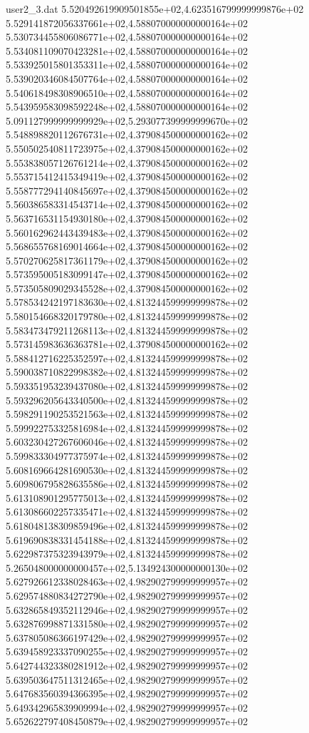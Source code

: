 \begin{filecontents}{user2_3.dat}
5.520492619909501855e+02,4.623516799999999876e+02
5.529141872056337661e+02,4.588070000000000164e+02
5.530734455806086771e+02,4.588070000000000164e+02
5.534081109070423281e+02,4.588070000000000164e+02
5.533925015801353311e+02,4.588070000000000164e+02
5.539020346084507764e+02,4.588070000000000164e+02
5.540618498308906510e+02,4.588070000000000164e+02
5.543959583098592248e+02,4.588070000000000164e+02
5.091127999999999929e+02,5.293077399999999670e+02
5.548898820112676731e+02,4.379084500000000162e+02
5.550502540811723975e+02,4.379084500000000162e+02
5.553838057126761214e+02,4.379084500000000162e+02
5.553715412415349419e+02,4.379084500000000162e+02
5.558777294140845697e+02,4.379084500000000162e+02
5.560386583314543714e+02,4.379084500000000162e+02
5.563716531154930180e+02,4.379084500000000162e+02
5.560162962443439483e+02,4.379084500000000162e+02
5.568655768169014664e+02,4.379084500000000162e+02
5.570270625817361179e+02,4.379084500000000162e+02
5.573595005183099147e+02,4.379084500000000162e+02
5.573505809029345528e+02,4.379084500000000162e+02
5.578534242197183630e+02,4.813244599999999878e+02
5.580154668320179780e+02,4.813244599999999878e+02
5.583473479211268113e+02,4.813244599999999878e+02
5.573145983636363781e+02,4.379084500000000162e+02
5.588412716225352597e+02,4.813244599999999878e+02
5.590038710822998382e+02,4.813244599999999878e+02
5.593351953239437080e+02,4.813244599999999878e+02
5.593296205643340500e+02,4.813244599999999878e+02
5.598291190253521563e+02,4.813244599999999878e+02
5.599922753325816984e+02,4.813244599999999878e+02
5.603230427267606046e+02,4.813244599999999878e+02
5.599833304977375974e+02,4.813244599999999878e+02
5.608169664281690530e+02,4.813244599999999878e+02
5.609806795828635586e+02,4.813244599999999878e+02
5.613108901295775013e+02,4.813244599999999878e+02
5.613086602257335471e+02,4.813244599999999878e+02
5.618048138309859496e+02,4.813244599999999878e+02
5.619690838331454188e+02,4.813244599999999878e+02
5.622987375323943979e+02,4.813244599999999878e+02
5.265048000000000457e+02,5.134924300000000130e+02
5.627926612338028463e+02,4.982902799999999957e+02
5.629574880834272790e+02,4.982902799999999957e+02
5.632865849352112946e+02,4.982902799999999957e+02
5.632876998871331580e+02,4.982902799999999957e+02
5.637805086366197429e+02,4.982902799999999957e+02
5.639458923337090255e+02,4.982902799999999957e+02
5.642744323380281912e+02,4.982902799999999957e+02
5.639503647511312465e+02,4.982902799999999957e+02
5.647683560394366395e+02,4.982902799999999957e+02
5.649342965839909994e+02,4.982902799999999957e+02
5.652622797408450879e+02,4.982902799999999957e+02

\end{filecontents}
